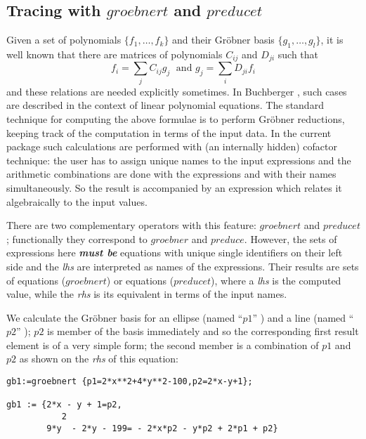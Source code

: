 \subsection{Tracing with $groebnert$ and $preducet$}
Given a set of polynomials $\{f_1,\ldots ,f_k\}$ and their Gr\"obner
basis $\{g_1,\ldots ,g_l\}$, it is well known that there are matrices of
polynomials $C_{ij}$ and $D_{ji}$ such that
\[
f_i = \displaystyle{\sum\limits_j} C_{ij} g_j \;\mbox{  and  } g_j =
\displaystyle{\sum\limits_i} D_{ji} f_i
\]
and these relations are needed explicitly sometimes.
In {\sc Buchberger} \cite{Buchberger:85}, such cases are described in the
context of linear polynomial equations. The standard technique for
computing the above formulae is to perform
Gr\"obner reductions, keeping track of the
computation in terms of the input data. In the current package such
calculations are performed with (an internally hidden) cofactor
technique: the user has to assign unique names to the input
expressions and the  arithmetic combinations are done with the
expressions and with their names simultaneously. So the result is
accompanied by an expression which relates it algebraically to the
input values.

 
There are two complementary operators with this feature: $groebnert$
and $preducet$; functionally they correspond to $groebner$ and $preduce$.
However, the sets of expressions here {\it {\bf must be}} equations
with unique single identifiers on their left side and the {\it lhs} are
interpreted as names of the expressions. Their results are
sets of equations ($groebnert$) or equations ($preducet$), where
a {\it lhs} is the computed value, while the {\it rhs} is its equivalent
in terms of the input names.

\example {}

We calculate the Gr\"obner basis for an ellipse (named ``$p1$'' ) and a
line (named ``$p2$'' ); $p2$ is member of the basis immediately and so
the corresponding first result element is of a very simple form; the
second member is a combination of $p1$ and $p2$ as shown on the
{\it rhs} of this equation:

\begin{verbatim}
gb1:=groebnert {p1=2*x**2+4*y**2-100,p2=2*x-y+1};

gb1 := {2*x - y + 1=p2,
           2
        9*y  - 2*y - 199= - 2*x*p2 - y*p2 + 2*p1 + p2}
\end{verbatim}

\example {}

